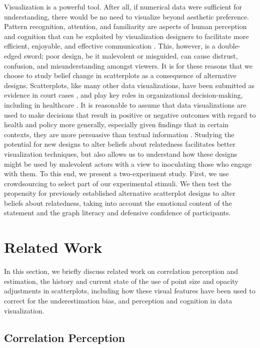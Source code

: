 \documentclass[sigconf]{acmart}
\begin{document}
Visualization is a powerful tool. After all, if numerical data were
sufficient for understanding, there would be no need to visualize beyond
aesthetic preference. Pattern recognition, attention, and familiarity
are aspects of human perception and cognition that can be exploited by
visualization designers to facilitate more efficient, enjoyable, and
effective communication \citep{franconeri_2021}. This, however, is a
double-edged sword; poor design, be it malevolent or misguided, can
cause distrust, confusion, and misunderstanding amongst viewers. It is
for these reasons that we choose to study belief change in scatterplots
as a consequence of alternative designs. Scatterplots, like many other
data visualizations, have been submitted as evidence in court cases
\citep{bobko_1979}, and play key roles in organizational
decision-making, including in healthcare \citep{poly_2019}. It is
reasonable to assume that data visualizations are used to make decisions
that result in positive or negative outcomes with regard to health and
policy more generally, especially given findings that in certain
contexts, they are more persuasive than textual information
\citep{pandey_2014}. Studying the potential for new designs to alter
beliefs about relatedness facilitates better visualization techniques,
but also allows us to understand how these designs might be used by
malevolent actors with a view to inoculating those who engage with them.
To this end, we present a two-experiment study. First, we use
crowdsourcing to select part of our experimental stimuli. We then test
the propensity for previously established alternative scatterplot
designs to alter beliefs about relatedness, taking into account the
emotional content of the statement and the graph literacy and defensive
confidence of participants.

\section{Related Work}\label{sec-rel-work-main}

In this section, we briefly discuss related work on correlation
perception and estimation, the history and current state of the use of
point size and opacity adjustments in scatterplots, including how these
visual features have been used to correct for the underestimation bias,
and perception and cognition in data visualization.

\subsection{Correlation Perception}\label{sec-corr-percept}
\end{document}
